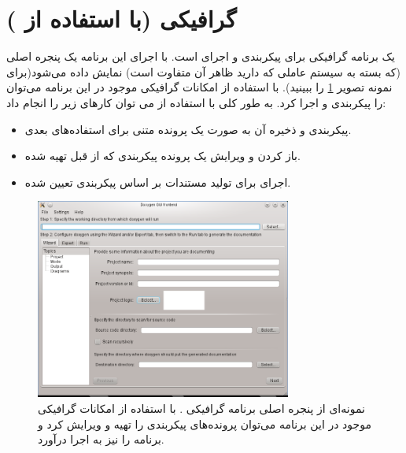%
% 
% 
% 
%
\section{گرافیکی (با استفاده از )}

یک برنامه گرافیکی برای پیکربندی و اجرای  است. با اجرای این برنامه یک
پنجره اصلی (که بسته به سیستم عاملی که دارید ظاهر آن متفاوت است) نمایش داده
می‌شود(برای نمونه تصویر \ref{پنجره_داکسی_ویزارد} را ببینید).
با استفاده از امکانات گرافیکی موجود در این برنامه می‌توان  را
پیکربندی و اجرا کرد. به طور کلی با استفاده از  می توان کارهای زیر
را انجام داد:

\begin{itemize}
 \item
پیکربندی  و ذخیره آن به صورت یک پرونده متنی برای استفاده‌های بعدی.
\item
باز کردن و ویرایش یک پرونده پیکربندی که از قبل تهیه شده.
\item
اجرای  برای تولید مستندات بر اساس پیکربندی تعیین شده.
\end{itemize}

\begin{figure}
\centering
\includegraphics[width=0.75\textwidth]{image/doxywizard_linux}
\caption[نمونه‌ای از پنجره اصلی برنامه گرافیکی .]
{
نمونه‌ای از پنجره اصلی برنامه گرافیکی . با استفاده از امکانات گرافیکی موجود در این برنامه می‌توان پرونده‌های پیکربندی را تهیه و ویرایش کرد و برنامه  را نیز به اجرا درآورد.
}
\label{پنجره_داکسی_ویزارد}
\end{figure}



